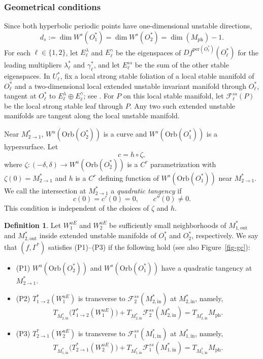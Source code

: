 \documentclass[11pt,a4paper]{article}
\theoremstyle{plain}
\theoremstyle{definition}
\newtheorem{definition}[theorem]{Definition}
\theoremstyle{plain}
\numberwithin{equation}{section}
\begin{document}
\subsubsection{Geometrical conditions}
\label{sec-GC}

Since both hyperbolic periodic points have one-dimensional unstable directions,
\[
d_s := \dim W^s(O_1^*) = \dim W^s(O_2^*) = \dim(M_\mathrm{ph}) - 1.
\]
For each $\ell \in \{1,2\}$, let $E_\ell^\lambda$ and $E_\ell^\gamma$ be the eigenspaces of $Df^{\mathrm{per}(O_\ell^*)}(O_\ell^*)$ for the leading multipliers $\lambda_\ell^*$ and $\gamma_\ell^*$, and let $E_\ell^{ss}$ be the sum of the other stable eigenspaces. In $U_\ell^*$, fix a local strong stable foliation of a local stable manifold of $O_\ell^*$ and a two-dimensional local extended unstable invariant manifold through $O_\ell^*$, tangent at $O_\ell^*$ to $E_\ell^\lambda \oplus E_\ell^\gamma$; see \cite{SSTC2001}. For $P$ on this local stable manifold, let $\mathcal{F}^{ss}_\ell(P)$ be the local strong stable leaf through $P$. Any two such extended unstable manifolds are tangent along the local unstable manifold.

Near $M_{2 \to 1}^*$, $W^u(\mathrm{Orb}(O_2^*))$ is a curve and $W^s(\mathrm{Orb}(O_1^*))$ is a hypersurface. Let
\[
c = h \circ \zeta,
\]
where $\zeta : (-\delta,\delta) \longrightarrow W^u(\mathrm{Orb}(O_2^*))$ is a $C^r$ parametrization with $\zeta(0) = M_{2 \to 1}^*$ and $h$ is a $C^r$ defining function of $W^s(\mathrm{Orb}(O_1^*))$ near $M_{2 \to 1}^*$. We call the intersection at $M_{2 \to 1}^*$ a \emph{quadratic tangency} if
\[
c(0) = c'(0) = 0,
\qquad
c''(0) \neq 0.
\]
This condition is independent of the choices of $\zeta$ and $h$.

\begin{definition}
Let $W_1^{uE}$ and $W_2^{uE}$ be sufficiently small neighborhoods of $M_{1,\mathrm{out}}^*$ and $M_{2,\mathrm{out}}^*$ inside extended unstable manifolds of $O_1^*$ and $O_2^*$, respectively. We say that $(f,\Gamma^*)$ satisfies \textup{(P1)}--\textup{(P3)} if the following hold (see also Figure~\ref{fig-gc}):
\begin{itemize}
\item \textup{(P1)} $W^u(\mathrm{Orb}(O_2^*))$ and $W^s(\mathrm{Orb}(O_1^*))$ have a quadratic tangency at $M_{2 \to 1}^*$.
\item \textup{(P2)} $T_{1 \to 2}^*(W_1^{uE})$ is transverse to $\mathcal{F}^{ss}_2(M_{2,\mathrm{in}}^*)$ at $M_{2,\mathrm{in}}^*$, namely,
\[
T_{M_{2,\mathrm{in}}^*}\bigl(T_{1 \to 2}^*(W_1^{uE})\bigr) + T_{M_{2,\mathrm{in}}^*}\mathcal{F}^{ss}_2(M_{2,\mathrm{in}}^*) = T_{M_{2,\mathrm{in}}^*} M_\mathrm{ph}.
\]
\item \textup{(P3)} $T_{2 \to 1}^*(W_2^{uE})$ is transverse to $\mathcal{F}^{ss}_1(M_{1,\mathrm{in}}^*)$ at $M_{1,\mathrm{in}}^*$, namely,
\[
T_{M_{1,\mathrm{in}}^*}\bigl(T_{2 \to 1}^*(W_2^{uE})\bigr) + T_{M_{1,\mathrm{in}}^*}\mathcal{F}^{ss}_1(M_{1,\mathrm{in}}^*) = T_{M_{1,\mathrm{in}}^*} M_\mathrm{ph}.
\]
\end{itemize}
\end{definition}
\end{document}
